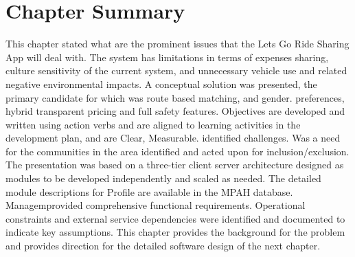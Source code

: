 \section{Chapter Summary}

This chapter stated what are the prominent issues that the Lets Go Ride Sharing App will deal with. The system has limitations in terms of expenses sharing, culture sensitivity of the current system, and unnecessary vehicle use and related negative environmental impacts. A conceptual solution was presented, the primary candidate for which was route based matching, and gender.
preferences, hybrid transparent pricing and full safety features. Objectives are developed and written using action verbs and are aligned to learning activities in the development plan, and are Clear, Measurable.
identified challenges. Was a need for the communities in the area identified and acted upon for inclusion/exclusion. The presentation was based on a three-tier client server architecture designed as modules to be developed independently and scaled as needed. The detailed module descriptions for Profile are available in the MPAH database.
Managemprovided comprehensive functional requirements. Operational constraints and external service dependencies were identified and documented to indicate key assumptions.
This chapter provides the background for the problem and provides direction for the detailed software design of the next chapter.

\newpage